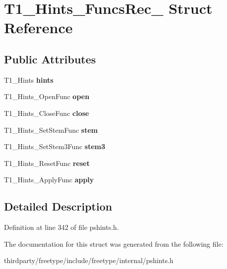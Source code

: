 \hypertarget{struct_t1___hints___funcs_rec__}{}\section{T1\+\_\+\+Hints\+\_\+\+Funcs\+Rec\+\_\+ Struct Reference}
\label{struct_t1___hints___funcs_rec__}
\subsection*{Public Attributes}
\begin{DoxyCompactItemize}
\item 
\mbox{\label{struct_t1___hints___funcs_rec___a6a58f489e362b746703b4caae91349ef}} 
T1\+\_\+\+Hints {\bfseries hints}
\item 
\mbox{\label{struct_t1___hints___funcs_rec___a41ca09a042c8e92f64822f19486a622a}} 
T1\+\_\+\+Hints\+\_\+\+Open\+Func {\bfseries open}
\item 
\mbox{\label{struct_t1___hints___funcs_rec___aa6d879215bff42f4b3851a9151c78505}} 
T1\+\_\+\+Hints\+\_\+\+Close\+Func {\bfseries close}
\item 
\mbox{\label{struct_t1___hints___funcs_rec___abdbf955a1fc9b19799ed8ea8137c9381}} 
T1\+\_\+\+Hints\+\_\+\+Set\+Stem\+Func {\bfseries stem}
\item 
\mbox{\label{struct_t1___hints___funcs_rec___acc1edae831d279929f93c8eb1872daa3}} 
T1\+\_\+\+Hints\+\_\+\+Set\+Stem3\+Func {\bfseries stem3}
\item 
\mbox{\label{struct_t1___hints___funcs_rec___a5646878cdabd593389e28cffd8b077cb}} 
T1\+\_\+\+Hints\+\_\+\+Reset\+Func {\bfseries reset}
\item 
\mbox{\label{struct_t1___hints___funcs_rec___a3fb5f01de31da9efb2ae8f5251b4d506}} 
T1\+\_\+\+Hints\+\_\+\+Apply\+Func {\bfseries apply}
\end{DoxyCompactItemize}


\subsection{Detailed Description}


Definition at line 342 of file pshints.\+h.



The documentation for this struct was generated from the following file\+:\begin{DoxyCompactItemize}
\item 
thirdparty/freetype/include/freetype/internal/pshints.\+h\end{DoxyCompactItemize}

